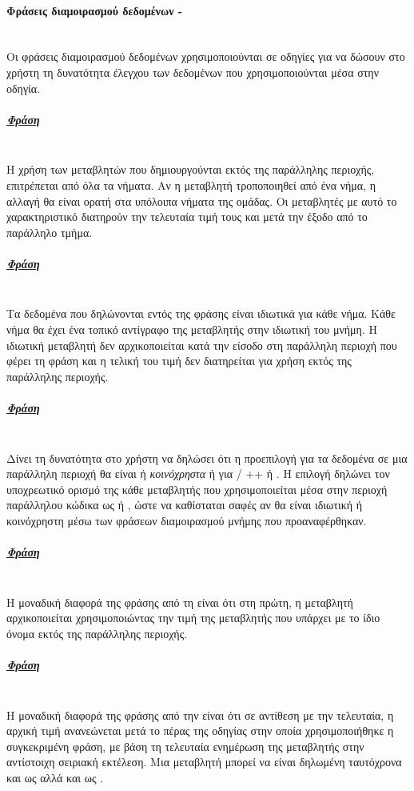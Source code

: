 \paragraph{Φράσεις διαμοιρασμού δεδομένων - }
\label{sec:link}
\ \\
Οι φράσεις διαμοιρασμού δεδομένων χρησιμοποιούνται σε οδηγίες για να δώσουν στο χρήστη τη δυνατότητα έλεγχου των
δεδομένων που χρησιμοποιούνται μέσα στην οδηγία.

\subparagraph{\underline{Φράση }}
\ \\
Η χρήση των μεταβλητών που δημιουργούνται εκτός της παράλληλης περιοχής, επιτρέπεται από όλα τα νήματα. Αν η μεταβλητή
τροποποιηθεί από ένα νήμα, η αλλαγή θα είναι ορατή στα υπόλοιπα νήματα της ομάδας. Οι μεταβλητές με αυτό το
χαρακτηριστικό διατηρούν την τελευταία τιμή τους και μετά την έξοδο από το παράλληλο τμήμα.

\subparagraph{\underline{Φράση }}
\ \\
Τα δεδομένα που δηλώνονται εντός της φράσης είναι ιδιωτικά για κάθε νήμα. Κάθε νήμα θα έχει ένα τοπικό αντίγραφο της
μεταβλητής στην ιδιωτική του μνήμη. Η ιδιωτική μεταβλητή δεν αρχικοποιείται κατά την είσοδο στη παράλληλη περιοχή που
φέρει τη φράση \textbf{} και η τελική του τιμή δεν διατηρείται για χρήση εκτός της παράλληλης περιοχής.
\clearpage
\subparagraph{\underline{Φράση }}
\ \\
Δίνει τη δυνατότητα στο χρήστη να δηλώσει ότι η προεπιλογή για τα δεδομένα σε μια παράλληλη περιοχή θα είναι ή
\emph{κοινόχρηστα} ή \emph{} για  / ++ ή \emph{}. Η επιλογή \emph{}
δηλώνει τον υποχρεωτικό ορισμό της κάθε μεταβλητής που χρησιμοποιείται μέσα στην περιοχή παράλληλου κώδικα ως
 ή , ώστε να καθίσταται σαφές αν θα είναι ιδιωτική ή κοινόχρηστη μέσω των φράσεων διαμοιρασμού
μνήμης που προαναφέρθηκαν.

\subparagraph{\underline{Φράση }}
\ \\
Η μοναδική διαφορά της φράσης \emph{} από τη \emph{} είναι ότι στη πρώτη, η μεταβλητή
αρχικοποιείται χρησιμοποιώντας την τιμή της μεταβλητής που υπάρχει με το ίδιο όνομα εκτός της παράλληλης περιοχής.

\subparagraph{\underline{Φράση }}
\ \\
Η μοναδική διαφορά της φράσης \emph{} από την \emph{} είναι ότι σε αντίθεση με την
τελευταία, η αρχική τιμή ανανεώνεται μετά το πέρας της οδηγίας στην οποία χρησιμοποιήθηκε η συγκεκριμένη φράση, με βάση τη τελευταία ενημέρωση της μεταβλητής στην αντίστοιχη σειριακή εκτέλεση. Μια
μεταβλητή μπορεί να είναι δηλωμένη ταυτόχρονα και ως \emph{} αλλά και ως \emph{}.

